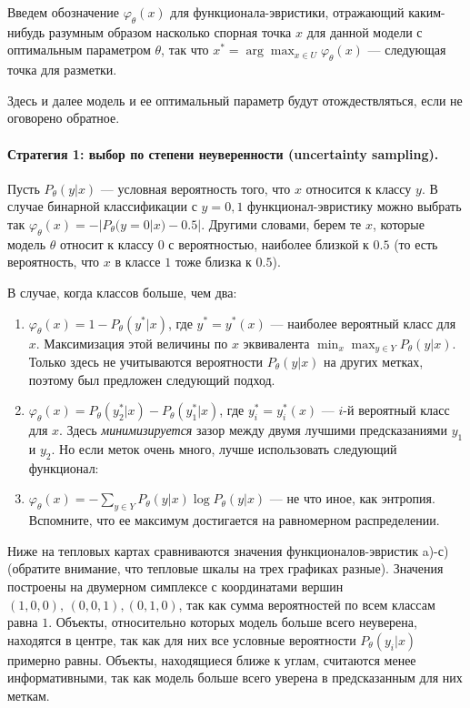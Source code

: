 \documentclass[specialist, 12pt, href]{article}
\begin{document}
Введем обозначение \(\varphi_{\theta}(x)\) для функционала-эвристики, отражающий каким-нибудь разумным образом насколько спорная точка $x$ для данной модели с оптимальным параметром $\theta$, так что
\(x^* = \arg\max_{x \in U} \varphi_{\theta}(x)\) --- следующая точка для
разметки.

Здесь и далее модель и ее оптимальный параметр будут отождествляться, если не оговорено обратное.

\paragraph{Стратегия 1: выбор по степени неуверенности (uncertainty
sampling).}

Пусть \(P_{\theta}(y|x)\) --- условная вероятность того, что \(x\)
относится к классу \(y\). В случае бинарной классификации с \(y = 0, 1\)
функционал-эвристику можно выбрать так
\(\varphi_{\theta}(x) = -|P_{\theta}(y = 0|x) - 0.5|\). Другими словами,
берем те \(x\), которые модель \(\theta\) относит к классу \(0\) с
вероятностью, наиболее близкой к \(0.5\) (то есть вероятность, что \(x\)
в классе \(1\) тоже близка к \(0.5\)).

В случае, когда классов больше, чем два:

\begin{enumerate}
\def\labelenumi{\alph{enumi})}
\item
  \(\varphi_{\theta}(x) = 1 - P_{\theta}(y^*|x)\), где \(y^* = y^*(x)\)
  --- наиболее вероятный класс для \(x\). Максимизация этой величины по
  \(x\) эквивалента \(\min_x\max_{y\in Y} P_{\theta}(y|x)\). Только
  здесь не учитываются вероятности \(P_{\theta}(y|x)\) на других метках,
  поэтому был предложен следующий подход.
\item
  \(\varphi_{\theta}(x) = P_{\theta}(y^*_2|x) - P_{\theta}(y^*_1|x)\),
  где \(y^*_i = y^*_i(x)\) --- \(i\)-й вероятный класс для \(x\). Здесь
  \emph{минимизируется} зазор между двумя лучшими предсказаниями \(y_1\)
  и \(y_2\). Но если меток очень много, лучше использовать следующий
  функционал:
\item
  \(\varphi_{\theta}(x) = - \sum_{y \in Y} P_{\theta}(y|x) \log P_{\theta}(y|x)\)
  --- не что иное, как энтропия. Вспомните, что ее максимум достигается
  на равномерном распределении.
\end{enumerate}

Ниже на тепловых картах сравниваются значения функционалов-эвристик
a)-с) (обратите внимание, что тепловые шкалы на трех графиках разные). Значения построены на двумерном симплексе с координатами вершин \((1, 0, 0),\, (0, 0, 1), (0, 1, 0)\), так как сумма вероятностей по всем классам равна \(1\).
Объекты, относительно которых модель больше всего неуверена, находятся в
центре, так как для них все условные вероятности
\(P_{\theta}(y_i|x)\) примерно равны. Объекты, находящиеся ближе к
углам, считаются менее информативными, так как модель больше всего
уверена в предсказанным для них меткам.
\end{document}
